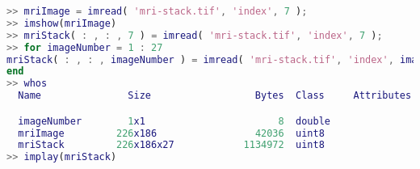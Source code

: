 \begin{lstlisting}[language=matlab]
>> mriImage = imread( 'mri-stack.tif', 'index', 7 );
>> imshow(mriImage)
>> mriStack( : , : , 7 ) = imread( 'mri-stack.tif', 'index', 7 );
>> for imageNumber = 1 : 27 
mriStack( : , : , imageNumber ) = imread( 'mri-stack.tif', 'index', imageNumber );
end
>> whos
  Name               Size                  Bytes  Class     Attributes

  imageNumber        1x1                       8  double              
  mriImage         226x186                 42036  uint8               
  mriStack         226x186x27            1134972  uint8  
>> implay(mriStack)

\end{lstlisting}